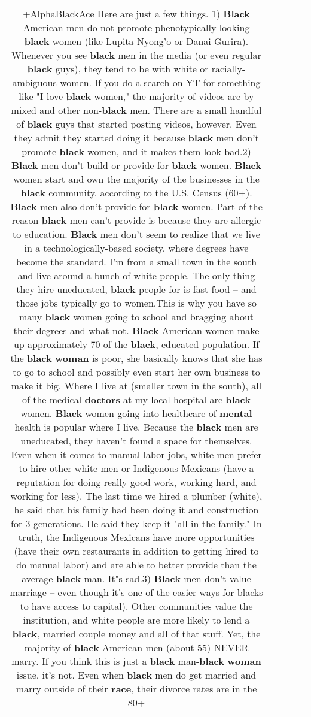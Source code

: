 \documentclass[11pt]{article}
\newlength\mylength
\begin{document}
\begin{center}
\begin{longtable}{|C{.65\mylength}|C{.30\mylength}|C{.12\mylength}|C{.12\mylength}|C{.12\mylength}|}
  \small +AlphaBlackAce Here are just a few things.  1) \textbf{Black} American men do not promote phenotypically-looking \textbf{black} women (like Lupita Nyong'o or Danai Gurira).  Whenever you see \textbf{black} men in the media (or even regular \textbf{black} guys), they tend to be with white or racially-ambiguous women.  If you do a search on YT for something like "I love \textbf{black} women," the majority of videos are by mixed and other non-\textbf{black} men.  There are a small handful of \textbf{black} guys that started posting videos, however.  Even they admit they started doing it because \textbf{black} men don't promote \textbf{black} women, and it makes them look bad.2) \textbf{Black} men don't build or provide for \textbf{black} women.  \textbf{Black} women start and own the majority of the businesses in the \textbf{black} community, according to the U.S. Census (60+).  \textbf{Black} men also don't provide for \textbf{black} women.  Part of the reason \textbf{black} men can't provide is because they are allergic to education.  \textbf{Black} men don't seem to realize that we live in a technologically-based society, where degrees have become the standard.  I'm from a small town in the south and live around a bunch of white people.  The only thing they hire uneducated, \textbf{black} people for is fast food -- and those jobs typically go to women.This is why you have so many \textbf{black} women going to school and bragging about their degrees and what not.  \textbf{Black} American women make up approximately 70 of the \textbf{black}, educated population.  If the \textbf{black} \textbf{woman} is poor, she basically knows that she has to go to school and possibly even start her own business to make it big.  Where I live at (smaller town in the south), all of the medical \textbf{doctors} at my local hospital are \textbf{black} women.  \textbf{Black} women going into healthcare of \textbf{mental} health is popular where I live.  Because the \textbf{black} men are uneducated, they haven't found a space for themselves.  Even when it comes to manual-labor jobs, white men prefer to hire other white men or Indigenous Mexicans (have a reputation for doing really good work, working hard, and working for less).  The last time we hired a plumber (white), he said that his family had been doing it and construction for 3 generations.  He said they keep it "all in the family."  In truth, the Indigenous Mexicans have more opportunities (have their own restaurants in addition to getting hired to do manual labor) and are able to better provide than the average \textbf{black} man.  It"s sad.3) \textbf{Black} men don't value marriage -- even though it's one of the easier ways for blacks to have access to capital).  Other communities value the institution, and white people are more likely to lend a \textbf{black}, married couple money and all of that stuff.  Yet, the majority of \textbf{black} American men (about 55) NEVER marry.  If you think this is just a \textbf{black} man-\textbf{black} \textbf{woman} issue, it's not.  Even when \textbf{black} men do get married and marry outside of their \textbf{race}, their divorce rates are in the 80+ 
\end{longtable}
\end{center}
\end{document}

